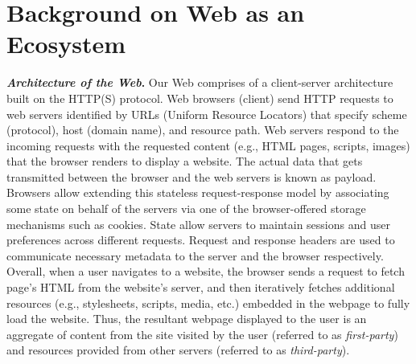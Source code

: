 \section{Background on Web as an Ecosystem}
\label{sec:background}


\noindent \textbf{\textit{Architecture of the Web}.} 
%
Our Web comprises of a client-server architecture built on the HTTP(S) protocol.
%
Web browsers (client) send HTTP requests to web servers identified by URLs (Uniform Resource Locators) that specify scheme (protocol), host (domain name), and resource path.
%
Web servers respond to the incoming requests with the requested content (e.g., HTML pages, scripts, images) that the browser renders to display a website.
%
The actual data that gets transmitted between the browser and the web servers is known as payload. 
%
Browsers allow extending this stateless request-response model by associating some state on behalf of the servers via one of the browser-offered storage mechanisms such as cookies. 
%
State allow servers to maintain sessions and user preferences across different requests.
%
Request and response headers are used to communicate necessary metadata to the server and the browser respectively.
%
Overall, when a user navigates to a website, the browser sends a request to fetch page's HTML from the website's server, and then iteratively fetches additional resources (e.g., stylesheets, scripts, media, etc.) embedded in the webpage to fully load the website.
%
Thus, the resultant webpage displayed to the user is an aggregate of content from the site visited by the user (referred to as \textit{first-party}) and resources provided from other servers (referred to as \textit{third-party}).



